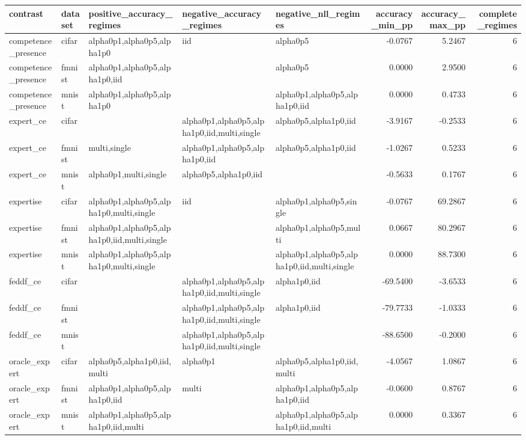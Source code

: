 \begin{tabular}{lllllrrr}
\toprule
contrast & dataset & positive\_accuracy\_regimes & negative\_accuracy\_regimes & negative\_nll\_regimes & accuracy\_min\_pp & accuracy\_max\_pp & complete\_regimes \\
\midrule
competence\_presence & cifar & alpha0p1,alpha0p5,alpha1p0 & iid & alpha0p5 & -0.0767 & 5.2467 & 6 \\
competence\_presence & fmnist & alpha0p1,alpha0p5,alpha1p0,iid &  & alpha0p5 & 0.0000 & 2.9500 & 6 \\
competence\_presence & mnist & alpha0p1,alpha0p5,alpha1p0 &  & alpha0p1,alpha0p5,alpha1p0,iid & 0.0000 & 0.4733 & 6 \\
expert\_ce & cifar &  & alpha0p1,alpha0p5,alpha1p0,iid,multi,single & alpha0p5,alpha1p0,iid & -3.9167 & -0.2533 & 6 \\
expert\_ce & fmnist & multi,single & alpha0p1,alpha0p5,alpha1p0,iid & alpha0p5,alpha1p0,iid & -1.0267 & 0.5233 & 6 \\
expert\_ce & mnist & alpha0p1,multi,single & alpha0p5,alpha1p0,iid &  & -0.5633 & 0.1767 & 6 \\
expertise & cifar & alpha0p1,alpha0p5,alpha1p0,multi,single & iid & alpha0p1,alpha0p5,single & -0.0767 & 69.2867 & 6 \\
expertise & fmnist & alpha0p1,alpha0p5,alpha1p0,iid,multi,single &  & alpha0p1,alpha0p5,multi & 0.0667 & 80.2967 & 6 \\
expertise & mnist & alpha0p1,alpha0p5,alpha1p0,multi,single &  & alpha0p1,alpha0p5,alpha1p0,iid,multi,single & 0.0000 & 88.7300 & 6 \\
feddf\_ce & cifar &  & alpha0p1,alpha0p5,alpha1p0,iid,multi,single & alpha1p0,iid & -69.5400 & -3.6533 & 6 \\
feddf\_ce & fmnist &  & alpha0p1,alpha0p5,alpha1p0,iid,multi,single & alpha1p0,iid & -79.7733 & -1.0333 & 6 \\
feddf\_ce & mnist &  & alpha0p1,alpha0p5,alpha1p0,iid,multi,single &  & -88.6500 & -0.2000 & 6 \\
oracle\_expert & cifar & alpha0p5,alpha1p0,iid,multi & alpha0p1 & alpha0p5,alpha1p0,iid,multi & -4.0567 & 1.0867 & 6 \\
oracle\_expert & fmnist & alpha0p1,alpha0p5,alpha1p0,iid & multi & alpha0p1,alpha0p5,alpha1p0,iid & -0.0600 & 0.8767 & 6 \\
oracle\_expert & mnist & alpha0p1,alpha0p5,alpha1p0,iid,multi &  & alpha0p1,alpha0p5,alpha1p0,iid,multi & 0.0000 & 0.3367 & 6 \\

\end{tabular}
